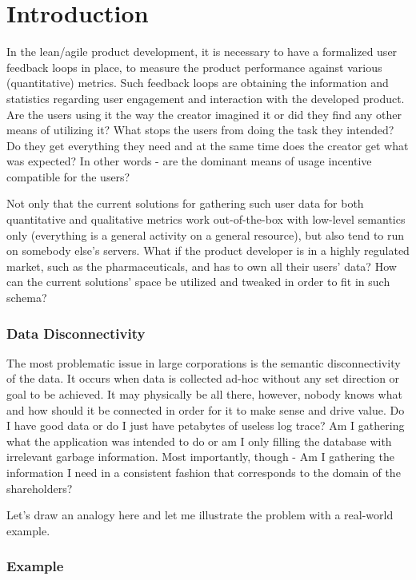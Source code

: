 \chapter{Introduction}

In the lean/agile product development, it is necessary to have a formalized user feedback loops in place, to measure the product performance against various (quantitative) metrics. Such feedback loops are obtaining the information and statistics regarding user engagement and interaction with the developed product. Are the users using it the way the creator imagined it or did they find any other means of utilizing it? What stops the users from doing the task they intended? Do they get everything they need and at the same time does the creator get what was expected? In other words - are the dominant means of usage incentive compatible for the users? 

Not only that the current solutions for gathering such user data for both quantitative and qualitative metrics work out-of-the-box with low-level semantics only (everything is a general activity on a general resource), but also tend to run on somebody else's servers. What if the product developer is in a highly regulated market, such as the pharmaceuticals, and has to own all their users' data? How can the current solutions' space be utilized and tweaked in order to fit in such schema?

\subsection*{Data Disconnectivity}

The most problematic issue in large corporations is the semantic disconnectivity of the data. It occurs when data is collected ad-hoc without any set direction or goal to be achieved. It may physically be all there, however, nobody knows what and how should it be connected in order for it to make sense and drive value. Do I have good data or do I just have petabytes of useless log trace? Am I gathering what the application was intended to do or am I only filling the database with irrelevant garbage information. Most importantly, though - Am I gathering the information I need in a consistent fashion that corresponds to the domain of the shareholders?

Let's draw an analogy here and let me illustrate the problem with a real-world example.

\newpage

\subsection*{Example}


